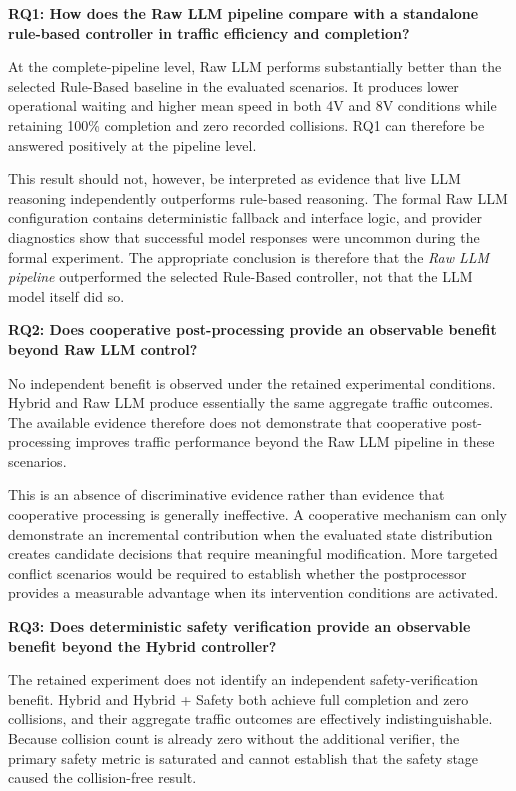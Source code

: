 \documentclass[letterpaper,10pt,conference]{ieeeconf}
\begin{document}
\textbf{RQ1: How does the Raw LLM pipeline compare with a standalone rule-based controller in traffic efficiency and completion?}



At the complete-pipeline level, Raw LLM performs substantially better than the selected Rule-Based baseline in the evaluated scenarios. It produces lower operational waiting and higher mean speed in both 4V and 8V conditions while retaining 100\% completion and zero recorded collisions. RQ1 can therefore be answered positively at the pipeline level.



This result should not, however, be interpreted as evidence that live LLM reasoning independently outperforms rule-based reasoning. The formal Raw LLM configuration contains deterministic fallback and interface logic, and provider diagnostics show that successful model responses were uncommon during the formal experiment. The appropriate conclusion is therefore that the \emph{Raw LLM pipeline} outperformed the selected Rule-Based controller, not that the LLM model itself did so.



\textbf{RQ2: Does cooperative post-processing provide an observable benefit beyond Raw LLM control?}



No independent benefit is observed under the retained experimental conditions. Hybrid and Raw LLM produce essentially the same aggregate traffic outcomes. The available evidence therefore does not demonstrate that cooperative post-processing improves traffic performance beyond the Raw LLM pipeline in these scenarios.



This is an absence of discriminative evidence rather than evidence that cooperative processing is generally ineffective. A cooperative mechanism can only demonstrate an incremental contribution when the evaluated state distribution creates candidate decisions that require meaningful modification. More targeted conflict scenarios would be required to establish whether the postprocessor provides a measurable advantage when its intervention conditions are activated.



\textbf{RQ3: Does deterministic safety verification provide an observable benefit beyond the Hybrid controller?}



The retained experiment does not identify an independent safety-verification benefit. Hybrid and Hybrid + Safety both achieve full completion and zero collisions, and their aggregate traffic outcomes are effectively indistinguishable. Because collision count is already zero without the additional verifier, the primary safety metric is saturated and cannot establish that the safety stage caused the collision-free result.
\end{document}
